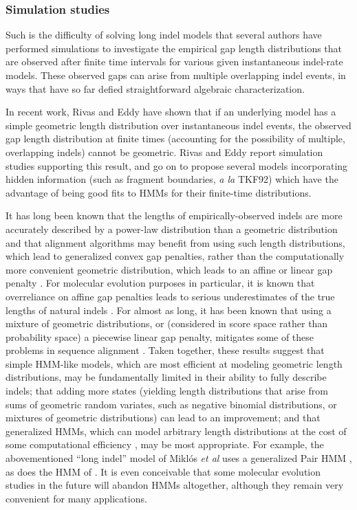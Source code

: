 \documentclass{bmcart}
\begin{document}
\subsubsection*{Simulation studies}

Such is the difficulty of solving long indel models that several authors have performed simulations
to investigate the empirical gap length distributions that are observed after finite time intervals
for various given instantaneous indel-rate models.
These observed gaps can arise from multiple overlapping indel events, in ways that have so far defied
straightforward algebraic characterization.

In recent work, Rivas and Eddy \cite{RivasEddy2015}
have shown that if an underlying model has a simple geometric length distribution over instantaneous indel events,
the observed gap length distribution at finite times (accounting for the possibility of multiple, overlapping indels) cannot be geometric.
Rivas and Eddy report simulation studies supporting this result,
and go on to propose several models incorporating hidden information
(such as fragment boundaries, {\em a la} TKF92)
which have the advantage of being good fits to HMMs for their finite-time distributions.

\color{red}
It has long been known that the lengths of empirically-observed indels are more accurately described
by a power-law distribution than a geometric distribution \cite{pmid8445636,ChangBenner2004,ShihengTao2007,pmid1604319,pmid17110395,pmid12954770}
and that alignment algorithms may benefit from using such length distributions, which lead to generalized convex gap penalties,
rather than the computationally more convenient geometric distribution, which leads to an affine or linear gap penalty \cite{pmid7769622,Cartwright2009}.
For molecular evolution purposes in particular, it is known that overreliance on affine gap penalties leads to serious underestimates
of the true lengths of natural indels \cite{pmid18073381}.
For almost as long, it has been known that using a mixture of geometric distributions,
or (considered in score space rather than probability space) a piecewise linear gap penalty,
mitigates some of these problems in sequence alignment \cite{MyersMiller88,DoEtAl2005,pmid18073381}.
\color{black}
Taken together, these results suggest that simple HMM-like models,
which are most efficient at modeling geometric length distributions,
may be fundamentally limited in their ability to fully describe indels;
that adding more states (yielding length distributions that arise from sums of geometric random variates, such as negative binomial distributions,
or mixtures of geometric distributions) can lead to an improvement;
and that generalized HMMs, which can model arbitrary length distributions at the cost of some
computational efficiency \cite{BurgeKarlin97},
may be most appropriate.
For example, the abovementioned ``long indel'' model of Mikl\'{o}s {\em et al} uses a generalized Pair HMM \cite{MiklosLunterHolmes2004},
as does the HMM of \cite{KimSinha2007}.
\color{red}
It is even conceivable that some molecular evolution studies in the future will abandon HMMs altogether,
although they remain very convenient for many applications.
\color{black}
\end{document}
